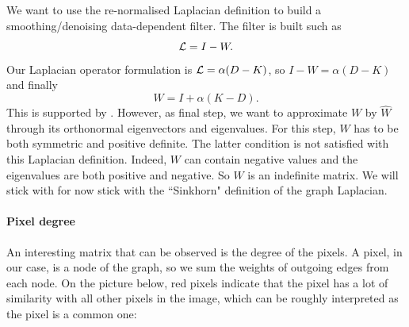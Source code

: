 We want to use the re-normalised Laplacian definition to build a smoothing/denoising data-dependent filter.
The filter is built such as
\[\operatorname{\mathcal{L}} = I-W.\]
Our Laplacian operator formulation is \(\operatorname{\mathcal{L}} = \alpha (D-K)\), so \(I-W = \alpha (D-K)\) and finally
\[W = I + \alpha (K-D).\]
This is supported by \cite{milanfar_new_2016}.
However, as final step, we want to approximate \(W\) by \(\hat{W}\) through its orthonormal eigenvectors and eigenvalues.
For this step, \(W\) has to be both symmetric and positive definite.
The latter condition is not satisfied with this Laplacian definition.
Indeed, \(W\) can contain negative values and the eigenvalues are both positive and negative.
So \(W\) is an indefinite matrix.
We will stick with for now stick with the ``Sinkhorn" \cite{milanfar_symmetrizing_2013} definition of the graph Laplacian.

\paragraph{Pixel degree}

An interesting matrix that can be observed is the degree of the pixels.
A pixel, in our case, is a node of the graph, so we sum the weights of outgoing edges from each node.
On the picture below, red pixels indicate that the pixel has a lot of similarity with all other pixels in the image, which can be roughly interpreted as the pixel is a common one:

